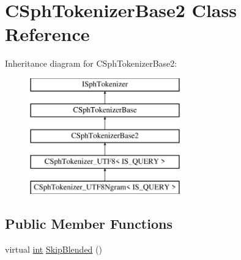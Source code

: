 \hypertarget{classCSphTokenizerBase2}{\section{C\-Sph\-Tokenizer\-Base2 Class Reference}
\label{classCSphTokenizerBase2}
}
Inheritance diagram for C\-Sph\-Tokenizer\-Base2\-:\begin{figure}[H]
\begin{center}
\leavevmode
\includegraphics[height=5.000000cm]{classCSphTokenizerBase2}
\end{center}
\end{figure}
\subsection*{Public Member Functions}
\begin{DoxyCompactItemize}
\item 
virtual \hyperlink{sphinxexpr_8cpp_a4a26e8f9cb8b736e0c4cbf4d16de985e}{int} \hyperlink{classCSphTokenizerBase2_ae46629836aa461387098ce561283a7bc}{Skip\-Blended} ()
\end{DoxyCompactItemize}

